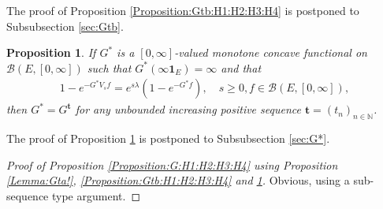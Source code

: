 \documentclass[12pt,a4paper]{amsart}
\numberwithin{equation}{section}
\theoremstyle{plain}
\newtheorem{prop}[thm]{Proposition}
\theoremstyle{definition}
\theoremstyle{remark}
\newcounter{N}
\newcounter{n}[N]
\begin{document}
The proof of Proposition \ref{Proposition:Gtb:H1:H2:H3:H4} is postponed to Subsubsection \ref{sec:Gtb}.

\begin{prop} \label{Proposition:G*:H1:H2:H3:H4}
If $G^*$ is a $[0,\infty]$-valued monotone concave functional on $\mathcal B(E,[0,\infty])$ such that $G^*(\infty \mathbf 1_E) = \infty$ and that
\begin{align}
 1 - e^{-G^* V_s f}
 = e^{s\lambda} (1 - e^{- G^* f}),
 \quad s\geq 0, f\in \mathcal B(E,[0,\infty]),
 \end{align}
then $G^* = G^\mathbf t$ for any unbounded increasing positive sequence $\mathbf t = (t_n)_{n\in \mathbb N}$.
\end{prop}

The proof of Proposition \ref{Proposition:G*:H1:H2:H3:H4} is postponed to Subsubsection \ref{sec:G*}.

\begin{proof}[Proof of Proposition \ref{Proposition:G:H1:H2:H3:H4} using Proposition \ref{Lemma:Gta!}, \ref{Proposition:Gtb:H1:H2:H3:H4} and \ref{Proposition:G*:H1:H2:H3:H4}]
Obvious, using a sub-sequence type argument.
\end{proof}
\end{document}
